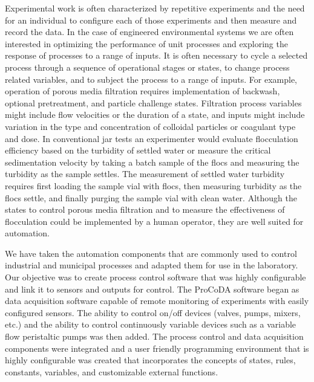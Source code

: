 \documentclass[letterpaper,10pt,english]{sphinxmanual}
\begin{document}
Experimental work is often characterized by repetitive experiments and the need for an individual to configure each of those experiments and then measure and record the data. In the case of engineered environmental systems we are often interested in optimizing the performance of unit processes and exploring the response of processes to a range of inputs. It is often necessary to cycle a selected process through a sequence of operational stages or states, to change process related variables, and to subject the process to a range of inputs. For example, operation of porous media filtration requires implementation of backwash, optional pretreatment, and particle challenge states. Filtration process variables might include flow velocities or the duration of a state, and inputs might include variation in the type and concentration of colloidal particles or coagulant type and dose. In conventional jar tests an experimenter would evaluate flocculation efficiency based on the turbidity of settled water or measure the critical sedimentation velocity by taking a batch sample of the flocs and measuring the turbidity as the sample settles. The measurement of settled water turbidity requires first loading the sample vial with flocs, then measuring turbidity as the flocs settle, and finally purging the sample vial with clean water. Although the states to control porous media filtration and to measure the effectiveness of flocculation could be implemented by a human operator, they are well suited for automation.

We have taken the automation components that are commonly used to control industrial and municipal processes and adapted them for use in the laboratory. Our objective was to create process control software that was highly configurable and link it to sensors and outputs for control. The ProCoDA software began as data acquisition software capable of remote monitoring of experiments with easily configured sensors. The ability to control on/off devices (valves, pumps, mixers, etc.) and the ability to control continuously variable devices such as a variable flow peristaltic pumps was then added. The process control and data acquisition components were integrated and a user friendly programming environment that is highly configurable was created that incorporates the concepts of states, rules, constants, variables, and customizable external functions.
\end{document}
